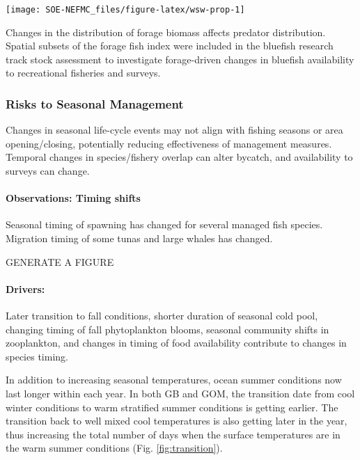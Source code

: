 \documentclass[
  10pt,
]{article}
\let\origfigure\figure
\let\endorigfigure\endfigure
\renewenvironment{figure}[1][2] {
    \expandafter\origfigure\expandafter[H]
} {
    \endorigfigure
}
\begin{document}
\begin{figure}

{\centering \texttt{[image: SOE-NEFMC\_files/figure-latex/wsw-prop-1]} 

}

\caption{Proportion of Warm Slope Water (WSW) and Labrador slope water (LSLW) entering the GOM through the Northeast Channel.}\label{fig:wsw-prop}
\end{figure}

Changes in the distribution of forage biomass affects predator distribution. Spatial subsets of the forage fish index were included in the bluefish research track stock assessment to investigate forage-driven changes in bluefish availability to recreational fisheries and surveys.

\hypertarget{risks-to-seasonal-management}{%
\subsubsection{Risks to Seasonal Management}\label{risks-to-seasonal-management}}

Changes in seasonal life-cycle events may not align with fishing seasons or area opening/closing, potentially reducing effectiveness of management measures. Temporal changes in species/fishery overlap can alter bycatch, and availability to surveys can change.

\hypertarget{observations-timing-shifts}{%
\paragraph{Observations: Timing shifts}\label{observations-timing-shifts}}

Seasonal timing of spawning has changed for several managed fish species. Migration timing of some tunas and large whales has changed.

GENERATE A FIGURE

\hypertarget{drivers-1}{%
\paragraph{Drivers:}\label{drivers-1}}

Later transition to fall conditions, shorter duration of seasonal cold pool, changing timing of fall phytoplankton blooms, seasonal community shifts in zooplankton, and changes in timing of food availability contribute to changes in species timing.

In addition to increasing seasonal temperatures, ocean summer conditions now last longer within each year. In both GB and GOM, the transition date from cool winter conditions to warm stratified summer conditions is getting earlier. The transition back to well mixed cool temperatures is also getting later in the year, thus increasing the total number of days when the surface temperatures are in the warm summer conditions (Fig. \ref{fig:transition}).
\end{document}

